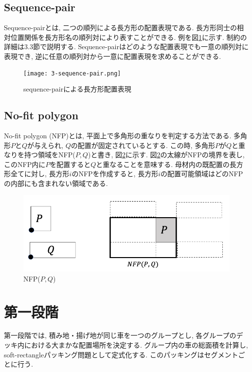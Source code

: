 \subsection{Sequence-pair}
Sequence-pairとは, 二つの順列による長方形の配置表現である\cite{seq-pair}. 
長方形同士の相対位置関係を長方形名の順列対により表すことができる. 
例を図\ref{s-p-eg}に示す. 制約の詳細は3.3節で説明する. 
Sequence-pairはどのような配置表現でも一意の順列対に表現でき, 逆に任意の順列対から一意に配置表現を求めることができる. \\ 

\begin{figure}[b]
    \hspace{3cm}
    \texttt{[image: 3-sequence-pair.png]}
    \caption{sequence-pairによる長方形配置表現}
    \label{s-p-eg}
\end{figure}
\clearpage

\subsection{No-fit polygon}
No-fit polygon (NFP)とは, 平面上で多角形の重なりを判定する方法である\cite{nfp}\cite{nfp2}. 
多角形$P$と$Q$が与えられ, $Q$の配置が固定されているとする. 
この時, 多角形$P$が$Q$と重なりを持つ領域をNFP($P,Q$)と書き, 図\ref{nfp-eg}に示す. 
図\ref{nfp-eg}の太線がNFPの境界を表し, このNFP内に$P$を配置すると$Q$と重なることを意味する. 
母材内の既配置の長方形全てに対し, 長方形$i$のNFPを作成すると, 長方形$i$の配置可能領域はどのNFPの内部にも含まれない領域である. \\


\begin{figure}[tbp]
    \hspace{3cm}
    \includegraphics[scale = 0.3, bb=0 0 10 10]{3nfp.png}
    \caption{NFP($P,Q$)}
    \label{nfp-eg}
\end{figure}

\section{第一段階}
第一段階では, 積み地・揚げ地が同じ車を一つのグループとし, 各グループのデッキ内における大まかな配置場所を決定する. 
グループ内の車の総面積を計算し, soft-rectangleパッキング問題として定式化する. 
このパッキングはセグメントごとに行う. 

